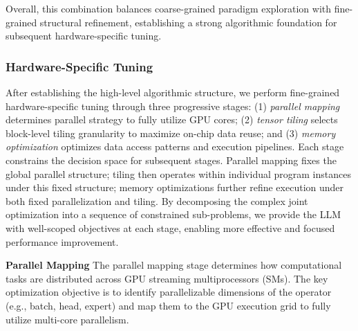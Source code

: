 \documentclass{article}
\theoremstyle{plain}
\theoremstyle{definition}
\theoremstyle{remark}
\begin{document}
Overall, this combination balances coarse-grained paradigm exploration with fine-grained structural refinement, establishing a strong algorithmic foundation for subsequent hardware-specific tuning.

\subsubsection{Hardware-Specific Tuning}
After establishing the high-level algorithmic structure, we perform fine-grained hardware-specific tuning through three progressive stages: (1) \textit{parallel mapping} determines parallel strategy to fully utilize GPU cores; (2) \textit{tensor tiling} selects block-level tiling granularity to maximize on-chip data reuse; and (3) \textit{memory optimization} optimizes data access patterns and execution pipelines. 
Each stage constrains the decision space for subsequent stages. Parallel mapping fixes the global parallel structure; tiling then operates within individual program instances under this fixed structure; memory optimizations further refine execution under both fixed parallelization and tiling. By decomposing the complex joint optimization into a sequence of constrained sub-problems, we provide the LLM with well-scoped objectives at each stage, enabling more effective and focused performance improvement.

\textbf{Parallel Mapping} The parallel mapping stage determines how computational tasks are distributed across GPU streaming multiprocessors (SMs). The key optimization objective is to identify parallelizable dimensions of the operator (e.g., batch, head, expert) and map them to the GPU execution grid to fully utilize multi-core parallelism.
\end{document}
